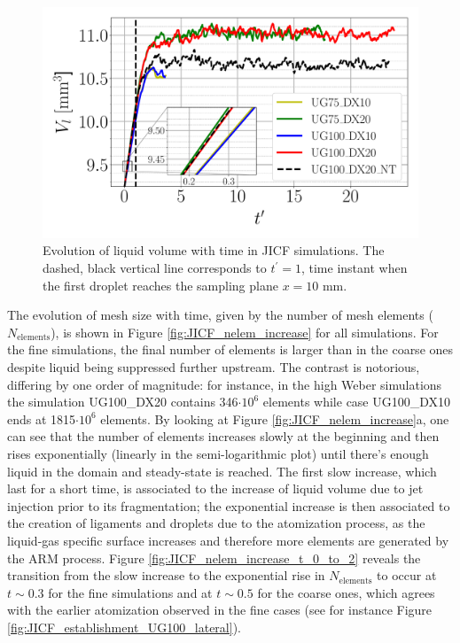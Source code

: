 \begin{figure}[ht]
\centering
	\centering
   \includegraphics[scale=0.3]{./part2_developments/figures_ch5_resolved_JICF/JICF_liquid_volume_increase}
   \vspace*{-0.15in}
   \caption[Evolution of liquid volume with time in JICF simulations.]{Evolution of liquid volume with time in JICF simulations. The dashed, black vertical line corresponds to $t^\prime = 1$, time instant when the first droplet reaches the sampling plane $x = 10$ mm.}
\label{fig:JICF_liquid_volume_increase}
\end{figure}

The evolution of mesh size with time, given by the number of mesh elements ($N_\mathrm{elements}$), is shown in Figure \ref{fig:JICF_nelem_increase} for all simulations. For the fine simulations, the final number of elements is larger than in the coarse ones despite liquid being suppressed further upstream. The contrast is notorious, differing by one order of magnitude: for instance, in the high Weber simulations the simulation UG100\_DX20 contains 346$\cdot 10^6$ elements while case UG100\_DX10 ends at 1815$\cdot 10^6$ elements. By looking at Figure \ref{fig:JICF_nelem_increase}a, one can see that the number of elements increases slowly at the beginning and then rises exponentially (linearly in the semi-logarithmic plot) until there’s enough liquid in the domain and steady-state is reached. The first slow increase, which last for a short time, is associated to the increase of liquid volume due to jet injection prior to its fragmentation; the exponential increase is then associated to the creation of ligaments and droplets due to the atomization process, as the liquid-gas specific surface increases and therefore more elements are generated by the ARM process. Figure \ref{fig:JICF_nelem_increase_t_0_to_2} reveals the transition from the slow increase to the exponential rise in $N_\mathrm{elements}$ to occur at $t \sim 0.3$ for the fine simulations and at $t \sim 0.5$ for the coarse ones, which agrees with the earlier atomization observed in the fine cases (see for instance Figure \ref{fig:JICF_establishment_UG100_lateral}).



